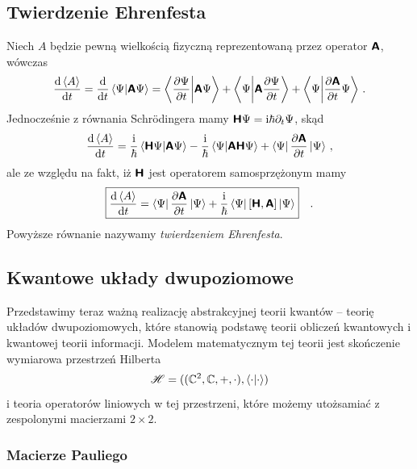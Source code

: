 \documentclass{myclass}
\begin{document}
\subsection{Twierdzenie Ehrenfesta}

Niech \(A\) będzie pewną wielkością fizyczną reprezentowaną przez operator \(\boldsymbol{\mathsf{A}}\), wówczas
\begin{equation*}
        \dv{\expectationvalue{A}}{t} = \dv{}{t} \braket{\Psi}{\oper{A}\Psi}
        = \braket{\pdv{\Psi}{t}}{\oper{A}\Psi} + \braket{\Psi}{\oper{A}\pdv{\Psi}{t}} + \braket{\Psi}{\pdv{\oper{A}}{t}\Psi}\,.
\end{equation*}
Jednocześnie z równania Schr\"{o}dingera mamy \(\boldsymbol{\mathsf{H}}\Psi=\mathrm{i}\hbar{\partial_t\Psi}\), skąd
\begin{equation*}
    \dv{\expectationvalue{A}}{t} = \frac{\im}{\hbar}\braket{\oper{H}\Psi}{\oper{A}\Psi} - \frac{\im}{\hbar}\braket{\Psi}{\oper{A}\oper{H}\Psi} + \bra{\Psi}\pdv{\oper{A}}{t}\ket{\Psi}\,,
\end{equation*}
ale ze względu na fakt, iż \(\boldsymbol{\mathsf{H}}\) jest operatorem samosprzężonym mamy
\begin{equation*}
    \boxed{
    \dv{\expectationvalue{A}}{t} = \bra{\Psi}\pdv{\oper{A}}{t}\ket{\Psi} + \frac{\im}{\hbar}\bra{\Psi}[\oper{H},\oper{A}]\ket{\Psi}
    }\quad.
\end{equation*}
Powyższe równanie nazywamy \textit{twierdzeniem Ehrenfesta}.

\subsection{Kwantowe układy dwupoziomowe}

Przedstawimy teraz ważną realizację abstrakcyjnej teorii kwantów -- teorię układów dwupoziomowych,
które stanowią podstawę teorii obliczeń kwantowych i kwantowej teorii informacji. Modelem
matematycznym tej teorii jest skończenie wymiarowa przestrzeń Hilberta
\begin{equation*}
    \mathscr{H} = ((\mathbb{C}^2, \mathbb{C}, +, \cdot), \braket{\cdot})
\end{equation*}
i teoria operatorów liniowych w tej przestrzeni, które możemy utożsamiać z zespolonymi macierzami
\(2\times 2\).

\subsubsection{Macierze Pauliego}
\end{document}
